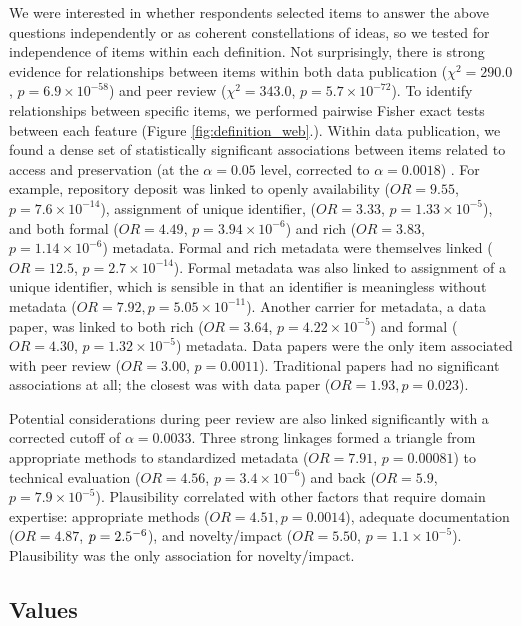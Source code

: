 \documentclass[10pt]{article}
\begin{document}
We were interested in whether respondents selected items to answer the above questions independently or as coherent constellations of ideas, so we tested for independence of items within each definition. 
Not surprisingly, there is strong evidence for relationships between items within both data publication ($\chi^{2}=290.0$, $p=6.9\times10^{-58}$) and peer review ($\chi^{2}= 343.0$, $p= 5.7\times10^{-72}$).
To identify relationships between specific items, we performed pairwise Fisher exact tests between each feature (Figure \ref{fig:definition_web}.).
Within data publication, we found a dense set of statistically significant associations between items related to access and preservation (at the $\alpha=0.05$ level, corrected to $\alpha=0.0018$)	.
For example, repository deposit was linked to openly availability ($OR=9.55$, $p=7.6\times10^{-14}$), assignment of unique identifier, ($OR= 3.33$, $p= 1.33\times10^{-5}$), and both formal ($OR= 4.49$, $p= 3.94\times10^{-6}$) and rich ($OR= 3.83$, $p=1.14\times10^{-6}$) metadata.
Formal and rich metadata were themselves linked ($OR= 12.5$, $p=2.7\times10^{-14}$). 
Formal metadata was also linked to assignment of a unique identifier, which is sensible in that an identifier is meaningless without metadata ($OR= 7.92, p= 5.05\times10^{-11}$).
Another carrier for metadata, a data paper, was linked to both rich ($OR=3.64$, $p=4.22\times10^{-5}$) and formal ($OR=4.30$, $p=1.32\times10^{-5}$) metadata.
Data papers were the only item associated with peer review ($OR=3.00$, $p=0.0011$).
Traditional papers had no significant associations at all; the closest was with data paper ($OR=1.93, p=0.023$).

Potential considerations during peer review are also linked significantly with a corrected cutoff of $\alpha=0.0033$.
Three strong linkages formed a triangle from appropriate methods to standardized metadata ($OR=7.91$, $p=0.00081$) to technical evaluation ($OR=4.56$, $p=3.4\times10^{-6}$) and back ($OR=5.9$, $p=7.9\times10^{-5}$).
Plausibility correlated with other factors that require domain expertise: appropriate methods ($OR=4.51, p=0.0014$), adequate documentation ($OR=4.87$, $p=2.5\time10^{-6}$), and novelty/impact ($OR=5.50$, $p=1.1\times10^{-5}$).
Plausibility was the only association for novelty/impact.

\subsection*{Values}
\end{document}
